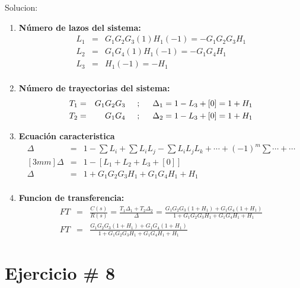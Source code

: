 \documentclass[12pt]{article}
\begin{document}
Solucion:
\begin{enumerate}
  \item \textbf{N\'umero de lazos del sistema:}
    \begin{eqnarray*}
      L_{1} &=& G_{1}G_{2}G_{3}(1)H_{1}(-1) = - G_{1}G_{2}G_{3}H_{1} \\
      L_{2} &=& G_{1}G_{4}(1)H_{1}(-1) = - G_{1}G_{4}H_{1} \\
      L_{3} &=& H_{1}(-1) = - H_{1} \\
    \end{eqnarray*}
  \item \textbf{N\'umero de trayectorias del sistema:}
    \begin{eqnarray*}
      T_{1} &=& G_{1}G_{2}G_{3} \hspace{5mm} ; \hspace{5mm} \Delta_{1}=1-L_{3} + [0]=1+H_{1} \\
      T_{2} &=& G_{1}G_{4} \hspace{5mm} ; \hspace{5mm} \Delta_{2}=1-L_{3} + [0]=1+H_{1} \\
    \end{eqnarray*}
  \item \textbf{Ecuaci\'on caracteristica}
    \begin{eqnarray*}
      \Delta &=& 1-\sum L_{i}+\sum L_{i}L_{j}-\sum L_{i}L_{j}L_{k}+\cdots +(-1)^{m}\sum \cdots +\cdots\\ [3mm]
      \Delta&=& 1-[L_{1}+L_{2}+L_{3}+[0]]\\
      \Delta&=& 1+G_{1}G_{2}G_{3}H_{1}+G_{1}G_{4}H_{1}+H_{1}\\
    \end{eqnarray*}
  \item \textbf{Funcion de transferencia:}
    \begin{eqnarray*}
      FT &=& \frac{C(s)}{R(s)}=\frac{T_{1}\Delta_{1}+T_{2}\Delta_{2}}{\Delta}=
      \frac{G_{1}G_{2}G_{3}(1+H_{1})+G_{1}G_{4}(1+H_{1})}{1+G_{1}G_{2}G_{3}H_{1}+G_{1}G_{4}H_{1}+H_{1}}\\[3mm]
      FT &=& \frac{G_{1}G_{2}G_{3}(1+H_{1})+G_{1}G_{4}(1+H_{1})}{1+G_{1}G_{2}G_{3}H_{1}+G_{1}G_{4}H_{1}+H_{1}}
    \end{eqnarray*}

\end{enumerate}

\newpage

\section*{Ejercicio \# 8}
\end{document}
